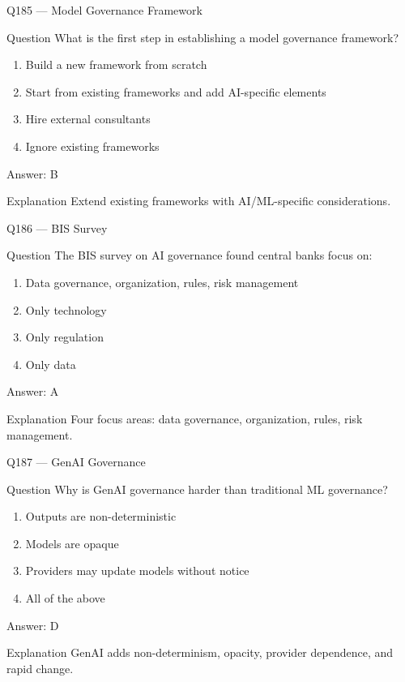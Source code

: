 \documentclass[aspectratio=169,8pt]{beamer}
\begin{document}
	\begin{frame}{Q185 --- Model Governance Framework}
		\begin{block}{Question}
			What is the first step in establishing a model governance framework?
		\end{block}
		\begin{enumerate}
			\item Build a new framework from scratch
			\item Start from existing frameworks and add AI-specific elements
			\item Hire external consultants
			\item Ignore existing frameworks
		\end{enumerate}
		\begin{exampleblock}{Answer: B}\end{exampleblock}
		\begin{block}{Explanation}
			Extend existing frameworks with AI/ML-specific considerations.
		\end{block}
	\end{frame}
	
	\begin{frame}{Q186 --- BIS Survey}
		\begin{block}{Question}
			The BIS survey on AI governance found central banks focus on:
			\begin{enumerate}
				\item Data governance, organization, rules, risk management
				\item Only technology
				\item Only regulation
				\item Only data
			\end{enumerate}
		\end{block}
		\begin{exampleblock}{Answer: A}\end{exampleblock}
		\begin{block}{Explanation}
			Four focus areas: data governance, organization, rules, risk management.
		\end{block}
	\end{frame}
	
	\begin{frame}{Q187 --- GenAI Governance}
		\begin{block}{Question}
			Why is GenAI governance harder than traditional ML governance?
			\begin{enumerate}
				\item Outputs are non-deterministic
				\item Models are opaque
				\item Providers may update models without notice
				\item All of the above
			\end{enumerate}
		\end{block}
		\begin{exampleblock}{Answer: D}\end{exampleblock}
		\begin{block}{Explanation}
			GenAI adds non-determinism, opacity, provider dependence, and rapid change.
		\end{block}
	\end{frame}
	
\end{document}
